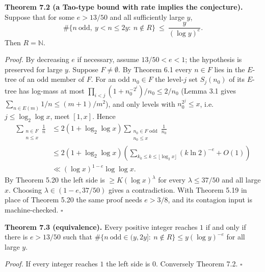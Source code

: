 \documentclass[11pt,a4paper]{article}
\begin{document}
\textbf{Theorem 7.2 (a Tao-type bound with rate implies the
conjecture).} Suppose that for some \(e>13/50\) and all sufficiently
large \(y\), \[
\#\{n\ \text{odd},\ y<n\le 2y:\ n\notin R\}\ \le\ \frac{y}{(\log y)^{e}} .
\] Then \(R=\mathbb N\).

\emph{Proof.} By decreasing \(e\) if necessary, assume \(13/50<e<1\);
the hypothesis is preserved for large \(y\). Suppose \(F\ne\emptyset\).
By Theorem 6.1 every \(n\in F\) lies in the \(E\)-tree of an odd member
of \(F\). For an odd \(n_0\in F\) the level-\(j\) set \(S_j(n_0)\) of
its \(E\)-tree has log-mass at most
\(\prod_{i<j}(1+n_0^{-2^i})/n_0\le 2/n_0\) (Lemma 3.1 gives
\(\sum_{n\in E(m)}1/n\le(m+1)/m^2\)), and only levels with
\(n_0^{2^j}\le x\), i.e.~\(j\le\log_2\log x\), meet \([1,x]\). Hence \[
\begin{aligned}
\sum_{\substack{n\in F\\n\le x}}\frac1n
&\le2(1+\log_2\log x)
 \sum_{\substack{n_0\in F\text{ odd}\\n_0\le x}}\frac1{n_0}\\
&\le2(1+\log_2\log x)
 \left(\sum_{k_0\le k\le\lfloor\log_2x\rfloor}(k\ln2)^{-e}+O(1)\right)\\
&\ll(\log x)^{1-e}\log\log x.
\end{aligned}
\] By Theorem 5.20 the left side is \(\ge K(\log x)^{\lambda}\) for
every \(\lambda\le37/50\) and all large \(x\). Choosing
\(\lambda\in(1-e,37/50)\) gives a contradiction. With Theorem 5.19 in
place of Theorem 5.20 the same proof needs \(e>3/8\), and its contagion
input is machine-checked. \(\square\)

\textbf{Theorem 7.3 (equivalence).} Every positive integer reaches \(1\)
if and only if there is \(e>13/50\) such that
\(\#\{n\ \text{odd}\in(y,2y]:\ n\notin R\}\le y(\log y)^{-e}\) for all
large \(y\).

\emph{Proof.} If every integer reaches \(1\) the left side is \(0\).
Conversely Theorem 7.2. \(\square\)
\end{document}
